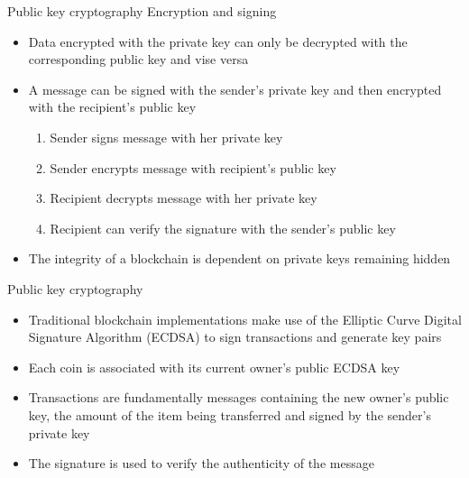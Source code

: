 \documentclass[11pt]{beamer}
\begin{document}

\begin{frame}{Public key cryptography}
	Encryption and signing
	\begin{itemize}
		\item Data encrypted with the private key can only be decrypted with the corresponding public key and vise versa
		\item A message can be signed with the sender's private key and then encrypted with the recipient's public key
		\begin{enumerate}
			\item Sender signs message with her private key
			\item Sender encrypts message with recipient's public key
			\item Recipient decrypts message with her private key
			\item Recipient can verify the signature with the sender's public key
		\end{enumerate}
		\item The integrity of a blockchain is dependent on private keys remaining hidden
	\end{itemize}
\end{frame}




\begin{frame}{Public key cryptography}
	\begin{itemize}
		\item Traditional blockchain implementations make use of the Elliptic Curve Digital Signature Algorithm (ECDSA) to sign transactions and generate key pairs
		\item Each coin is associated with its current owner's public ECDSA key
		\item Transactions are fundamentally messages containing the new owner's public key, the amount of the item being transferred and signed by the sender's private key
		\item The signature is used to verify the authenticity of the message
	\end{itemize}
\end{frame}
\end{document}
